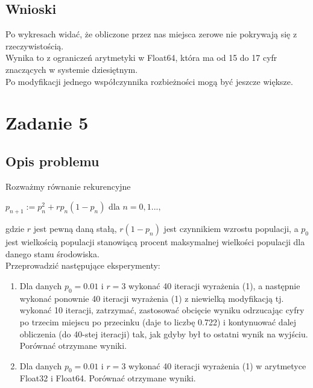 \documentclass{article}
\begin{document}
\subsection*{Wnioski}
	Po wykresach widać, że obliczone przez nas miejsca zerowe nie pokrywają się z rzeczywistością. \\
	Wynika to z ograniczeń arytmetyki w Float64, która ma od 15 do 17 cyfr znaczących w systemie dziesiętnym. \\
	Po modyfikacji jednego współczynnika rozbieżności mogą być jeszcze większe.

\section*{Zadanie 5}
\subsection*{Opis problemu}
	Rozważmy równanie rekurencyjne \\
	\centerline{$p_{n+1} := p_n^2 + rp_n(1 - p_n)$ dla $n = 0, 1...,$ \\}
	gdzie $r$ jest pewną daną stałą, $r(1 - p_n)$ jest czynnikiem wzrostu populacji, a $p_0$ jest wielkością populacji stanowiącą procent maksymalnej wielkości populacji dla danego stanu środowiska. \\
	Przeprowadzić następujące eksperymenty:
	\begin{enumerate}
        \item Dla danych $p_0 = 0.01$ i $r = 3$ wykonać 40 iteracji wyrażenia (1), a następnie wykonać ponownie 40 iteracji wyrażenia (1) z niewielką modyfikacją tj. wykonać 10 iteracji, zatrzymać, zastosować obcięcie wyniku odrzucając cyfry po trzecim miejscu po przecinku (daje to liczbę 0.722) i kontynuować dalej obliczenia (do 40-stej iteracji) tak, jak gdyby był to ostatni wynik na wyjściu. Porównać otrzymane wyniki.
        \item Dla danych $p_0 = 0.01$ i $r = 3$ wykonać 40 iteracji wyrażenia (1) w arytmetyce Float32 i Float64. Porównać otrzymane wyniki.
    \end{enumerate}
\end{document}
